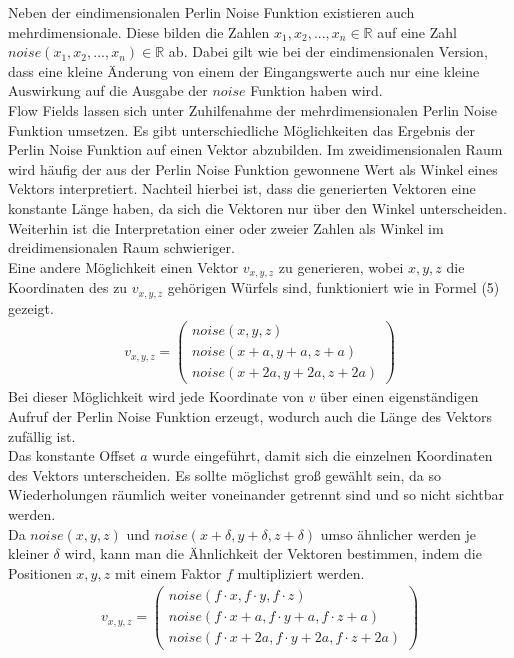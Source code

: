\documentclass[11pt,a4paper]{article}
\begin{document}
\noindent
Neben der eindimensionalen Perlin Noise Funktion existieren auch mehrdimensionale. Diese bilden die Zahlen $x_1, x_2, ..., x_n \in \mathbb{R}$ auf eine Zahl $noise(x_1, x_2, ..., x_n) \in \mathbb{R}$ ab. Dabei gilt wie bei der eindimensionalen Version, dass eine kleine Änderung von einem der Eingangswerte auch nur eine kleine Auswirkung auf die Ausgabe der $noise$ Funktion haben wird.\\
Flow Fields lassen sich unter Zuhilfenahme der mehrdimensionalen Perlin Noise Funktion umsetzen. Es gibt unterschiedliche Möglichkeiten das Ergebnis der Perlin Noise Funktion auf einen Vektor abzubilden. Im zweidimensionalen Raum wird häufig der aus der Perlin Noise Funktion gewonnene Wert als Winkel eines Vektors interpretiert. Nachteil hierbei ist, dass die generierten Vektoren eine konstante Länge haben, da sich die Vektoren nur über den Winkel unterscheiden. Weiterhin ist die Interpretation einer oder zweier Zahlen als Winkel im dreidimensionalen Raum schwieriger.\\
Eine andere Möglichkeit einen Vektor $v_{x,y,z}$ zu generieren, wobei $x, y, z$ die Koordinaten des zu $v_{x, y, z}$ gehörigen Würfels sind, funktioniert wie in Formel (5) gezeigt.
\begin{align}
v_{x,y,z} = \left(
\begin{array}{c}
noise(x, y, z) \\
noise(x+a, y+a, z+a) \\
noise(x+2a, y+2a, z+2a)
\end{array}
\right)
\end{align}
\noindent
Bei dieser Möglichkeit wird jede Koordinate von $v$ über einen eigenständigen Aufruf der Perlin Noise Funktion erzeugt, wodurch auch die Länge des Vektors zufällig ist.\\
Das konstante Offset $a$ wurde eingeführt, damit sich die einzelnen Koordinaten des Vektors unterscheiden. Es sollte möglichst groß gewählt sein, da so Wiederholungen räumlich weiter voneinander getrennt sind und so nicht sichtbar werden.\\
Da $noise(x, y, z)$ und $noise(x+\delta, y+\delta, z+\delta)$ umso ähnlicher werden je kleiner $\delta$ wird, kann man die Ähnlichkeit der Vektoren bestimmen, indem die Positionen $x, y, z$ mit einem Faktor $f$ multipliziert werden.
\begin{align}
v_{x,y,z} = \left(
\begin{array}{c}
noise(f \cdot x, f \cdot y, f \cdot z) \\
noise(f \cdot x+a, f \cdot y+a, f \cdot z+a) \\
noise(f \cdot x+2a, f \cdot y+2a, f \cdot z+2a)
\end{array}
\right)
\end{align}
\end{document}
